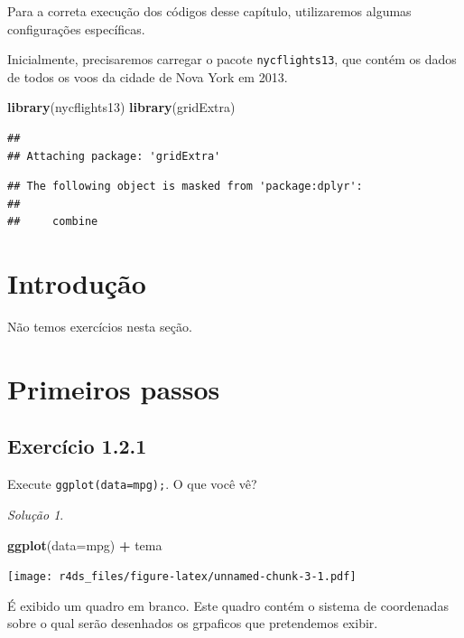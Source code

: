 \documentclass[
]{latex/krantz}
\newenvironment{Shaded}{\begin{snugshade}}{\end{snugshade}}
\newcommand{\AttributeTok}[1]{\textcolor[rgb]{0.13,0.29,0.53}{#1}}
\newcommand{\FunctionTok}[1]{\textcolor[rgb]{0.13,0.29,0.53}{\textbf{#1}}}
\newcommand{\NormalTok}[1]{#1}
\newcommand{\SpecialCharTok}[1]{\textcolor[rgb]{0.81,0.36,0.00}{\textbf{#1}}}
\theoremstyle{definition}
\theoremstyle{definition}
\theoremstyle{definition}
\theoremstyle{definition}
\theoremstyle{remark}
\newtheorem*{solution}{Solução}
\begin{document}
Para a correta execução dos códigos desse capítulo, utilizaremos algumas configurações específicas.

Inicialmente, precisaremos carregar o pacote \texttt{nycflights13}, que contém os dados de todos os voos da cidade de Nova York em 2013.

\begin{Shaded}
\begin{Highlighting}[]
\FunctionTok{library}\NormalTok{(nycflights13)}
\FunctionTok{library}\NormalTok{(gridExtra)}
\end{Highlighting}
\end{Shaded}

\begin{verbatim}
## 
## Attaching package: 'gridExtra'
\end{verbatim}

\begin{verbatim}
## The following object is masked from 'package:dplyr':
## 
##     combine
\end{verbatim}

\hypertarget{introduuxe7uxe3o}{%
\section{Introdução}\label{introduuxe7uxe3o}}

Não temos exercícios nesta seção.

\hypertarget{primeiros-passos}{%
\section{Primeiros passos}\label{primeiros-passos}}

\hypertarget{exr1-2-1}{%
\subsection*{Exercício 1.2.1}\label{exr1-2-1}}

Execute \texttt{ggplot(data=mpg);}. O que você vê?

\begin{solution}
\leavevmode

\begin{Shaded}
\begin{Highlighting}[]
\FunctionTok{ggplot}\NormalTok{(}\AttributeTok{data=}\NormalTok{mpg) }\SpecialCharTok{+}
\NormalTok{    tema}
\end{Highlighting}
\end{Shaded}

\texttt{[image: r4ds\_files/figure-latex/unnamed-chunk-3-1.pdf]}

É exibido um quadro em branco. Este quadro contém o sistema de coordenadas sobre o qual serão desenhados os grpaficos que pretendemos exibir.

\end{solution}
\end{document}
